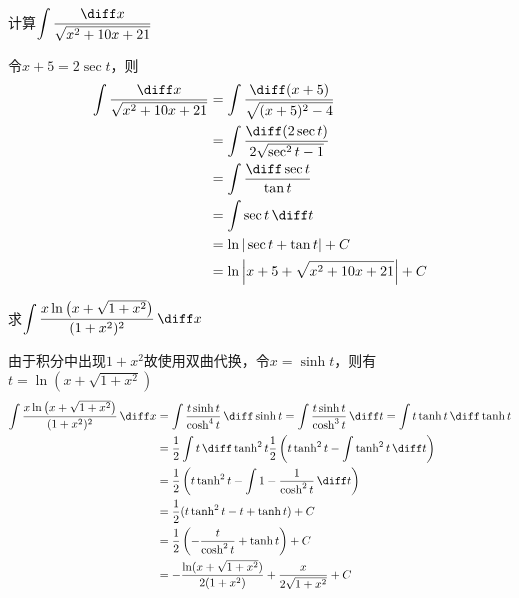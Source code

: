 \begin{example}
    计算$\displaystyle\int\frac{\diff x}{\sqrt{x^2+10x+21}}$
\end{example}
\begin{solution}
    令$x+5=2\sec t$，则
    \begin{align*}
        \int\frac{\diff x}{\sqrt{x^2+10x+21}} & = \int\frac{\diff (x+5)}{\sqrt{(x+5)^2-4}}       \\
                                              & = \int\frac{\diff(2\sec t)}{2\sqrt{\sec^2 t -1}} \\
                                              & = \int\frac{\diff\sec t}{\tan t}                 \\
                                              & = \int\sec t\,\diff t                            \\
                                              & = \ln|\sec t+\tan t| +C                          \\
                                              & = \ln\left|x+5+\sqrt{x^2+10x+21}\right| +C
    \end{align*}
\end{solution}

\begin{example}
    求$\displaystyle\int \frac{x\ln\left(x+\sqrt{1+x^2}\right)}{(1+x^2)^2}\,\diff x$
\end{example}
\begin{solution}
    由于积分中出现$1+x^2$故使用双曲代换，令$x = \sinh t$，则有$t = \ln(x+\sqrt{1+x^2})$
    \begin{align*}
        \int \frac{x\ln\left(x+\sqrt{1+x^2}\right)}{(1+x^2)^2}\,\diff x
         & = \int \frac{t\sinh t}{\cosh^4t}\,\diff \sinh t
        = \int \frac{t\sinh t}{\cosh^3t}\,\diff t
        = \int t\tanh t \,\diff \tanh t                                                 \\
         & = \frac{1}{2} \int t \,\diff \tanh^2 t
        \frac{1}{2} \left( t\tanh^2 t - \int \tanh^2 t\,\diff t \right)                 \\
         & = \frac{1}{2} \left( t\tanh^2 t - \int 1-\frac{1}{\cosh^2t}\,\diff t \right) \\
         & = \frac{1}{2} (t\tanh^2 t - t + \tanh t)+C                                   \\
         & = \frac{1}{2} \left(-\frac{t}{\cosh^2 t} + \tanh t\right)+C                  \\
         & =  -\frac{\ln(x+\sqrt{1+x^2})}{2(1+x^2)} + \frac{x}{2\sqrt{1+x^2}}+C         \\
    \end{align*}
\end{solution}

